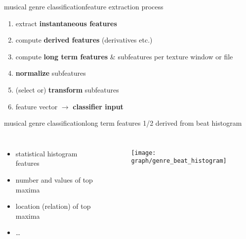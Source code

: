         \begin{frame}{musical genre classification}{feature extraction process}
            \begin{enumerate}
                \item	extract \textbf{instantaneous features}
                \smallskip
                \item<2->	compute \textbf{derived features} (derivatives etc.)
                \smallskip
                \item<3->	compute \textbf{long term features} \& subfeatures per texture window or file
                \smallskip	
                \item<4->	\textbf{normalize} subfeatures
                \smallskip
                \item<5->   (select or) \textbf{transform} subfeatures
                \smallskip
                \item<7->	feature vector $\rightarrow$ \textbf{classifier input}
            \end{enumerate}
            \vspace{20mm}
        \end{frame}
        \begin{frame}{musical genre classification}{long term features 1/2}
            derived from beat histogram
            \begin{columns}
                \begin{itemize}
                    \item   statistical histogram features
                    \item   number and values of top maxima
                    \item   location (relation) of top maxima
                    \item   \ldots
                \end{itemize}
            \begin{figure}
                \centering
                \texttt{[image: graph/genre\_beat\_histogram]}
            \end{figure}
            \end{columns}
        \end{frame}
